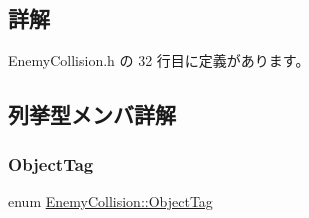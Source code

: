 \subsection{詳解}


 Enemy\+Collision.\+h の 32 行目に定義があります。



\subsection{列挙型メンバ詳解}
\mbox{\label{class_enemy_collision_a8423c2c1dce9ba8ab2ba9bed82ee4843}} 
\subsubsection{\texorpdfstring{Object\+Tag}{ObjectTag}}
{\footnotesize\ttfamily enum \mbox{\hyperlink{class_enemy_collision_a8423c2c1dce9ba8ab2ba9bed82ee4843}{Enemy\+Collision\+::\+Object\+Tag}}}

